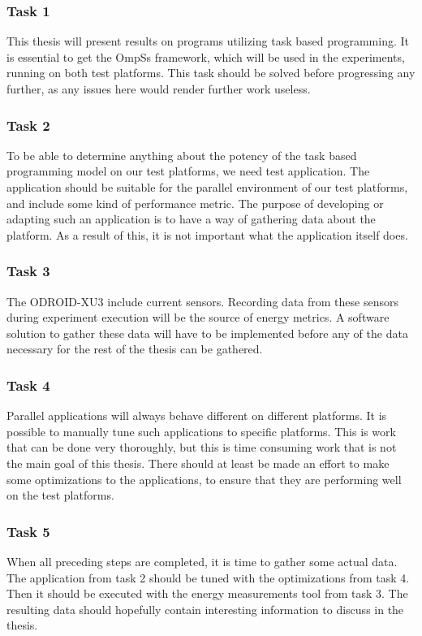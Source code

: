 \subsubsection{Task 1}
This thesis will present results on programs utilizing task based programming.
It is essential to get the OmpSs framework, which will be used in the experiments, running on both test platforms.
This task should be solved before progressing any further, as any issues here would render further work useless.

\subsubsection{Task 2}
To be able to determine anything about the potency of the task based programming model on our test platforms, we need test application.
The application should be suitable for the parallel environment of our test platforms, and include some kind of performance metric.
The purpose of developing or adapting such an application is to have a way of gathering data about the platform.
As a result of this, it is not important what the application itself does.

\subsubsection{Task 3}
The ODROID-XU3 include current sensors.
Recording data from these sensors during experiment execution will be the source of energy metrics.
A software solution to gather these data will have to be implemented before any of the data necessary for the rest of the thesis can be gathered.

\subsubsection{Task 4}
Parallel applications will always behave different on different platforms.
It is possible to manually tune such applications to specific platforms.
This is work that can be done very thoroughly, but this is time consuming work that is not the main goal of this thesis.
There should at least be made an effort to make some optimizations to the applications, to ensure that they are performing well on the test platforms.

\subsubsection{Task 5}
When all preceding steps are completed, it is time to gather some actual data.
The application from task 2 should be tuned with the optimizations from task 4.
Then it should be executed with the energy measurements tool from task 3.
The resulting data should hopefully contain interesting information to discuss in the thesis.

